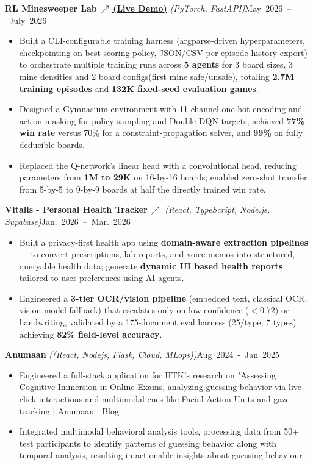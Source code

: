 \documentclass[10pt,letterpaper]{article}
\newcommand{\projectHeading}[3]{%
  \par\noindent\textbf{#1} \textit{(#2)}\hfill\mbox{#3}\par
}
\begin{document}
\projectHeading{RL Minesweeper Lab\,\href{https://rl-minesweeper-lab.vercel.app/}{\textnormal{\scriptsize$\nearrow$\,\normalsize (Live Demo)}}}{PyTorch, FastAPI}{May 2026 -- July 2026}
\begin{itemize}
  \item Built a CLI-configurable training harness (argparse-driven hyperparameters, checkpointing on best-scoring policy, JSON/CSV per-episode history export) to orchestrate multiple training runs across \textbf{5 agents} for 3 board sizes, 3 mine densities and 2 board configs(first mine safe/unsafe), totaling \textbf{2.7M training episodes} and \textbf{132K fixed-seed evaluation games}.
  \item Designed a Gymnasium environment with 11-channel one-hot encoding and action masking for policy sampling and Double DQN targets; achieved \textbf{77\% win rate} versus 70\% for a constraint-propagation solver, and \textbf{99\%} on fully deducible boards.
  \item Replaced the Q-network's linear head with a convolutional head, reducing parameters from \textbf{1M to 29K} on 16-by-16 boards; enabled zero-shot transfer from 5-by-5 to 9-by-9 boards at half the directly trained win rate.
\end{itemize}

\projectHeading{Vitalis - Personal Health Tracker\,\href{https://vitalis-aitracker.vercel.app/}{\scriptsize$\nearrow$}}{React, TypeScript, Node.js, Supabase}{Jan. 2026 -- Mar. 2026}
\begin{itemize}
  \item Built a privacy-first health app using \textbf{domain-aware extraction pipelines} — to convert prescriptions, lab reports, and voice memos
  into structured, queryable health data; generate \textbf{dynamic UI based health reports} tailored to user preferences using AI agents.
  \item Engineered a \textbf{3-tier OCR/vision pipeline} (embedded text, classical OCR, vision-model fallback) that escalates only on low confidence ($<0.72$) or handwriting, validated by a 175-document eval harness (25/type, 7 types) achieving \textbf{82\% field-level accuracy}.
\end{itemize}

\projectHeading{Anumaan}{(React, Nodejs, Flask, Cloud, MLops)}{Aug 2024 - Jan 2025}
\begin{itemize}
\item Engineered a full-stack application for IITK's research on "Assessing Cognitive Immersion in Online Exams, analyzing guessing behavior via live click interactions and multimodal cues like Facial Action Units and gaze tracking | Anumaan | Blog
\item Integrated multimodal behavioral analysis tools, processing data from 50+ test participants to identify patterns of guessing behavior along with temporal analysis, resulting in actionable insights about guessing behaviour
\end{itemize}
\end{document}
